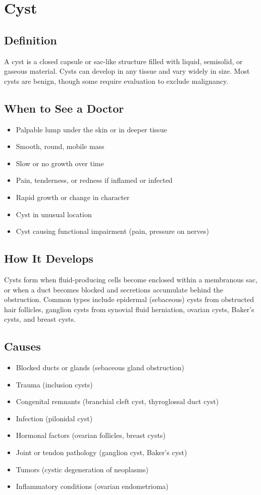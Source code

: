 \chapter{Cyst}

\section*{Definition}
A cyst is a closed capsule or sac-like structure filled with liquid, semisolid, or gaseous material. Cysts can develop in any tissue and vary widely in size. Most cysts are benign, though some require evaluation to exclude malignancy.

\section*{When to See a Doctor}
\begin{itemize}
\item Palpable lump under the skin or in deeper tissue
\item Smooth, round, mobile mass
\item Slow or no growth over time
\item Pain, tenderness, or redness if inflamed or infected
\item Rapid growth or change in character
\item Cyst in unusual location
\item Cyst causing functional impairment (pain, pressure on nerves)
\end{itemize}

\section*{How It Develops}
Cysts form when fluid-producing cells become enclosed within a membranous sac, or when a duct becomes blocked and secretions accumulate behind the obstruction. Common types include epidermal (sebaceous) cysts from obstructed hair follicles, ganglion cysts from synovial fluid herniation, ovarian cysts, Baker's cysts, and breast cysts.

\section*{Causes}
\begin{itemize}
\item Blocked ducts or glands (sebaceous gland obstruction)
\item Trauma (inclusion cysts)
\item Congenital remnants (branchial cleft cyst, thyroglossal duct cyst)
\item Infection (pilonidal cyst)
\item Hormonal factors (ovarian follicles, breast cysts)
\item Joint or tendon pathology (ganglion cyst, Baker's cyst)
\item Tumors (cystic degeneration of neoplasms)
\item Inflammatory conditions (ovarian endometrioma)
\end{itemize}

